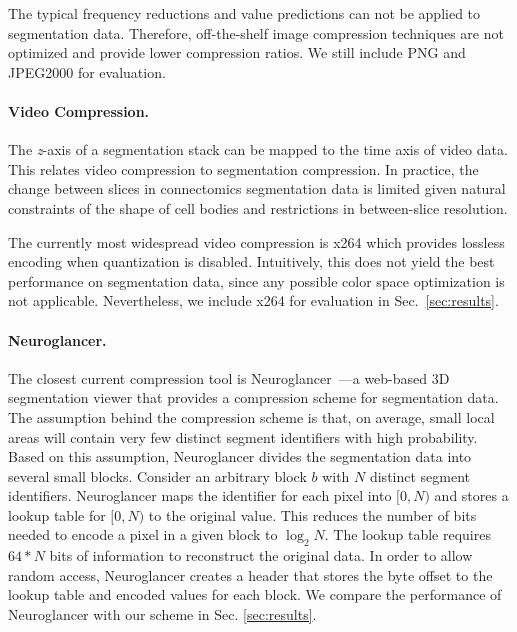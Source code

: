 The typical frequency reductions and value predictions can not be applied to segmentation data. Therefore, off-the-shelf image compression techniques are not optimized and provide lower compression ratios. We still include PNG and JPEG2000 for evaluation.

\paragraph{Video Compression.} 
The \textit{z}-axis of a segmentation stack can be mapped to the time axis of video data. This relates video compression to segmentation compression. In practice, the change between slices in connectomics segmentation data is limited given natural constraints of the shape of cell bodies and restrictions in between-slice resolution. 

The currently most widespread video compression is x264 which provides lossless encoding when quantization is disabled. Intuitively, this does not yield the best performance on segmentation data, since any possible color space optimization is not applicable. 
Nevertheless, we include x264 for evaluation in Sec.~\ref{sec:results}.

\paragraph{Neuroglancer.} 
The closest current compression tool is Neuroglancer~\cite{google2016compressed}---a web-based 3D segmentation viewer that provides a compression scheme for segmentation data. 
The assumption behind the compression scheme is that, on average, small local areas will contain very few distinct segment identifiers with high probability. 
Based on this assumption, Neuroglancer divides the segmentation data into several small blocks. 
Consider an arbitrary block $b$ with $N$ distinct segment identifiers.
Neuroglancer maps the identifier for each pixel into $[0, N)$ and stores a lookup table for $[0, N)$ to the original value. 
This reduces the number of bits needed to encode a pixel in a given block to $\log_2{N}$. 
The lookup table requires $64 * N$ bits of information to reconstruct the original data. 
In order to allow random access, Neuroglancer creates a header that stores the byte offset to the lookup table and encoded values for each block.
We compare the performance of Neuroglancer with our scheme in Sec. \ref{sec:results}.
